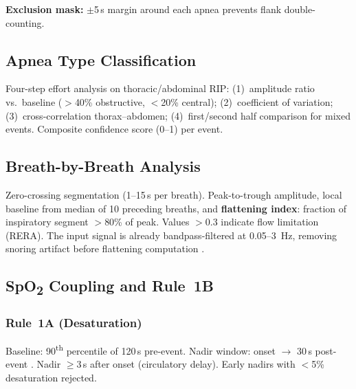 \documentclass[11pt,a4paper,twocolumn]{article}
\begin{document}
\begin{table}[H]
\centering\small
\caption{AASM 2.6 dual-sensor paradigm}
\end{table}

\noindent\textbf{Exclusion mask:} $\pm$5\,s margin around each apnea prevents flank double-counting.

\subsection{Apnea Type Classification}

Four-step effort analysis on thoracic/abdominal RIP: (1)~amplitude ratio vs.\ baseline ($>$40\% obstructive, $<$20\% central); (2)~coefficient of variation; (3)~cross-correlation thorax--abdomen; (4)~first/second half comparison for mixed events. Composite confidence score (0--1) per event.

\subsection{Breath-by-Breath Analysis}

Zero-crossing segmentation (1--15\,s per breath). Peak-to-trough amplitude, local baseline from median of 10 preceding breaths, and \textbf{flattening index}: fraction of inspiratory segment $>$80\% of peak. Values $>$0.3 indicate flow limitation (RERA). The input signal is already bandpass-filtered at 0.05--3~Hz, removing snoring artifact before flattening computation \cite{hosselet1998}.

\subsection{SpO\textsubscript{2} Coupling and Rule~1B}

\subsubsection{Rule~1A (Desaturation)}
Baseline: 90\textsuperscript{th} percentile of 120\,s pre-event. Nadir window: onset $\to$ 30\,s post-event \cite{uddin2021}. Nadir $\geq$3\,s after onset (circulatory delay). Early nadirs with $<$5\% desaturation rejected.
\end{document}
